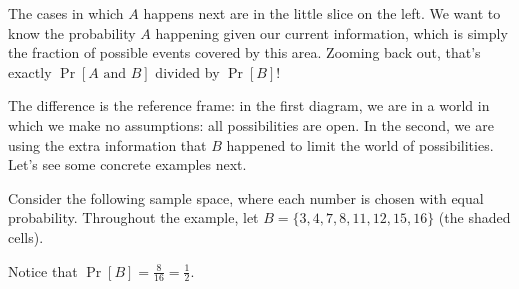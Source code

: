 The cases in which $A$ happens next are in the little slice on the 
left. We want to know the probability $A$ happening given our current 
information, which is simply the fraction of possible events covered by 
this area. Zooming back out, that's exactly $\Pr[A \text{ and } B]$ 
divided by $\Pr[B]$!

The difference is the reference frame: in the first diagram, we are in a 
world in which we make no assumptions: all possibilities are open. In 
the second, we are using the extra information that $B$ happened to 
limit the world of possibilities. Let's see some concrete examples next.

\begin{example}\label{ex:cond-vis}
    \color{blue} %
    Consider the following sample space, where each number is chosen with 
    equal probability.
    Throughout the example, let $B = \{3,4,7,8,11,12,15,16\}$ (the shaded 
    cells).

    \begin{center}
    \end{center}

    Notice that $\Pr[B] = \frac{8}{16} = \frac{1}{2}$.
    


\end{example}
